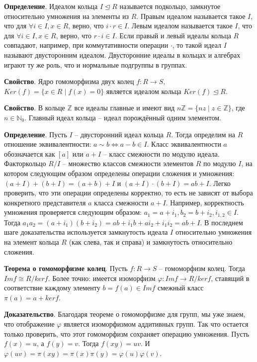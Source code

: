 \documentclass[a4paper]{book}
\begin{document}
\textbf{Определение}. Идеалом кольца $I \trianglelefteq R$ называется подкольцо, замкнутое относительно умножения на элементы из $R$. Правым идеалом называется такое $I$, что для $\forall i\in I, x\in R$, верно, что $i\cdot r \in I$. Левым идеалом называется такое $I$, что для $\forall i\in I, x\in R$, верно, что $r\cdot i\in I$. Если правый и левый идеалы кольца $R$ совпадают, например, при коммутативности операции $\cdot$, то такой идеал $I$ называют двусторонним идеалом. Двусторонние идеалы в кольцах и алгебрах играют ту же роль, что и нормальные подгруппы в группах. 

\textbf{Свойство}. Ядро гомоморфизма двух колец $f: R\rightarrow S$, $Ker(f) = \{x\in R\mid f(x) = 0 \}$ является идеалом кольца $Ker(f) \trianglelefteq R$. 

\textbf{Свойство}. В кольце $\mathbb{Z}$ все идеалы главные и имеют вид $n\mathbb{Z} = \{nz\mid z\in\mathbb{Z}\}$, где $n\in\mathbb{N}_0$. Главный идеал кольца -- идеал порождённый одним элементом. 

\textbf{Определение}. Пусть $I$ -- двусторонний идеал кольца $R$. Тогда определим на $R$ отношение эквивалентности: $a\sim b \Leftrightarrow a - b\in I$. Класс эквивалентности $a$ обозначается как $[a]$ или $a+I$ -- класс смежности по модулю идеала. Факторкольцо $R/I$ -- множество классов смежности элементов $R$ по модулю $I$, на котором следующим образом определены операции сложения и умножения: $(a+I) + (b+I) = (a+b)+I$ и $(a+I)\cdot(b+I) = ab+I$.  Легко проверить, что эти операции определены корректно, то есть не зависят от выбора конкретного представителя $a$ класса смежности $a+I$. Например, корректность умножения проверяется следующим образом: $a_1 = a+i_1, b_2 = b + i_2, i_{1,2}\in I$. Тогда $a_1 a_2 = (a+i_1)(b+i_2) = ab + i_1 b + ai_2 + i_1 i_2 = ab + I$. В последнем шаге доказательства используется замкнутость идеала $I$ относительно умножения на элемент кольца $R$ (как слева, так и справа) и замкнутость относительно сложения.

\textbf{Теорема о гомоморфизме колец}.  Пусть $f: R\rightarrow S$ -- гомоморфизм колец. Тогда $Imf \cong R/kerf$. Более точно: имеется изоморфизм $\varphi: Imf \rightarrow R/kerf$, ставящий в соответствие каждому элементу $b = f(a) \in Imf$ смежный класс $\pi(a) = a + kerf$. 

\textbf{Доказательство}. Благодаря теореме о гомоморфизме для групп, мы уже знаем, что отображение $\varphi$ является изоморфизмом аддитивных групп. Так что остается только проверить, что этот гомоморфизм сохраняет операцию умножения. Пусть $f(x) = u$, а $f(y) = v$. Тогда $f(xy) = uv$. И $\varphi(uv)  = \pi(xy) = \pi(x)\pi(y) = \varphi(u)\varphi(v)$. 
\end{document}
